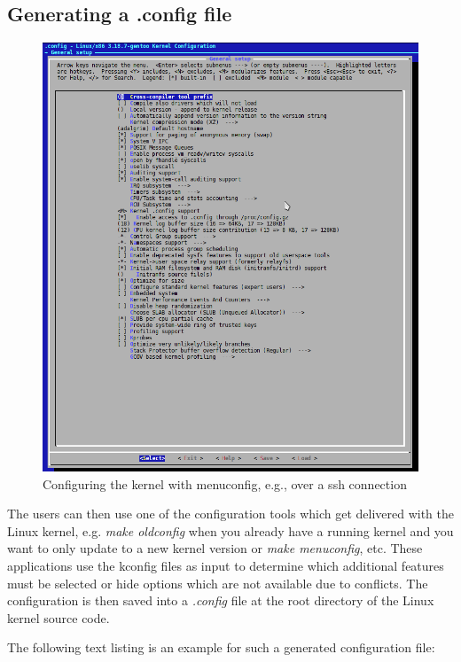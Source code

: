 \subsection{Generating a .config file}
\begin{figure}[ht]
  \centering
  \includegraphics[scale=0.5]{images/menuconfig}
  \caption{Configuring the kernel with menuconfig, e.g., over a ssh connection}
  \label{fig:menuconfig}
\end{figure}
The users can then use one of the configuration tools which get delivered with the Linux kernel,
e.g. {\it make oldconfig} when you already have a running kernel and you want to only 
update to a new kernel version or 
{\it make menuconfig}, etc.
These applications use the kconfig files as input to determine which additional features 
must be selected or hide options which are not available due to conflicts.
The configuration is then saved into a {\it .config} file at the root directory of the 
Linux kernel source code.

The following text listing is an example for such a generated configuration file:



